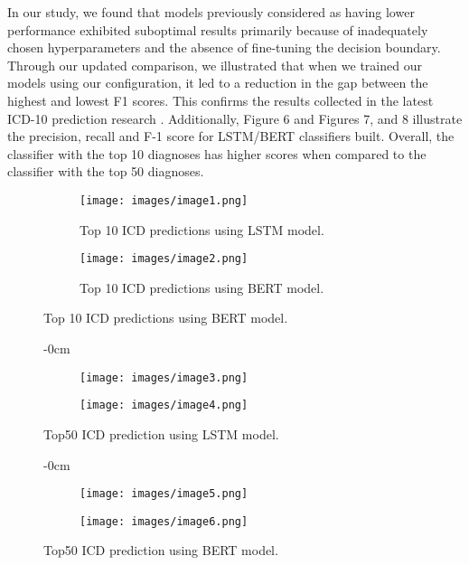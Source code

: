 \documentclass[journal,article,submit,pdftex,moreauthors]{Definitions/mdpi}
\begin{document}
In our study, we found that models previously considered as having lower performance exhibited suboptimal results primarily because of inadequately chosen hyperparameters and the absence of fine-tuning the decision boundary. Through our updated comparison, we illustrated that when we trained our models using our configuration, it led to a reduction in the gap between the highest and lowest F1 scores. This confirms the results collected in the latest ICD-10 prediction research \cite{ref-journal3}. 
Additionally, Figure 6 and Figures 7, and 8 illustrate the precision, recall and F-1 score for LSTM/BERT classifiers built. Overall, the classifier with the top 10 diagnoses has higher scores when compared to the classifier with the top 50 diagnoses.
\begin{figure}[H]
\centering
    \begin{figure}
        \texttt{[image: images/image1.png]}
        \caption{Top 10 ICD predictions using LSTM model.}
        \label{fig:first_image}
    \end{figure}
    \hfill %
    \begin{figure}
        \texttt{[image: images/image2.png]}
        \caption{Top 10 ICD predictions using BERT model.}
        \label{fig:second_image}
    \end{figure}
\end{figure}
\begin{figure}[H]
\begin{adjustwidth}{-\extralength}{0cm}
\centering
    \begin{subfigure}
        \centering
        \texttt{[image: images/image3.png]}
        \label{fig:image3}
    \end{subfigure}%
    \vspace{-2.5mm} %
    \begin{subfigure}
        \centering
        \texttt{[image: images/image4.png]}
        \label{fig:image4}
    \end{subfigure}
\end{adjustwidth}
\caption{Top50 ICD prediction using LSTM model.}
\label{fig:images}
\end{figure}
\begin{figure}[H]
\begin{adjustwidth}{-\extralength}{0cm}
\centering
    \begin{subfigure}
        \centering
        \texttt{[image: images/image5.png]}
        \label{fig:image3}
    \end{subfigure}%
    \vspace{-2.5mm} %
    \begin{subfigure}
        \centering
        \texttt{[image: images/image6.png]}
        \label{fig:image4}
    \end{subfigure}
\end{adjustwidth}
\caption{Top50 ICD prediction using BERT model.}
\label{fig:images}
\end{figure}
\end{document}
